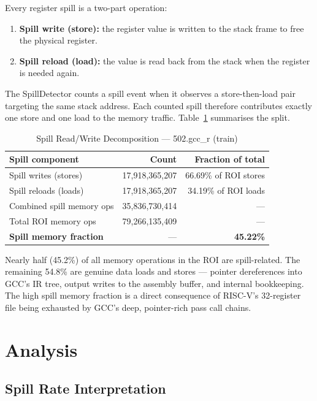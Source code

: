 \documentclass[conference]{IEEEtran}
\begin{document}
Every register spill is a two-part operation:
\begin{enumerate}
    \item \textbf{Spill write (store):} the register value is written
          to the stack frame to free the physical register.
    \item \textbf{Spill reload (load):} the value is read back from
          the stack when the register is needed again.
\end{enumerate}

The SpillDetector counts a spill event when it observes a
store-then-load pair targeting the same stack address. Each counted
spill therefore contributes exactly one store and one load to the
memory traffic. Table~\ref{tab:rwdecomp} summarises the split.

\begin{table}[H]
\centering
\caption{Spill Read/Write Decomposition --- 502.gcc\_r (train)}
\label{tab:rwdecomp}
\begin{tabular}{lrr}
\toprule
\textbf{Spill component} & \textbf{Count} & \textbf{Fraction of total} \\
\midrule
Spill writes (stores) & 17,918,365,207 & 66.69\% of ROI stores \\
Spill reloads (loads) & 17,918,365,207 & 34.19\% of ROI loads  \\
\midrule
Combined spill memory ops & 35,836,730,414 & --- \\
Total ROI memory ops & 79,266,135,409 & --- \\
\textbf{Spill memory fraction} & --- & \textbf{45.22\%} \\
\bottomrule
\end{tabular}
\end{table}

Nearly half (45.2\%) of all memory operations in the ROI are
spill-related. The remaining 54.8\% are genuine data loads and
stores --- pointer dereferences into GCC's IR tree, output writes
to the assembly buffer, and internal bookkeeping. The high spill
memory fraction is a direct consequence of RISC-V's 32-register
file being exhausted by GCC's deep, pointer-rich pass call chains.

\section{Analysis}

\subsection{Spill Rate Interpretation}
\end{document}
